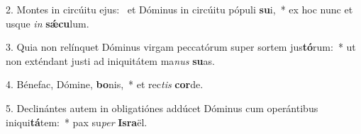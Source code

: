 2. Montes in circúitu ejus: \dag\  et Dóminus in circúitu pópuli \textbf{su}i,~*  ex hoc nunc et usque \textit{in} \textbf{sǽ}\textbf{cu}lum.\

3. Quia non relínquet Dóminus virgam peccatórum super sortem jus\textbf{tó}rum:~*  ut non exténdant justi ad iniquitátem ma\textit{nus} \textbf{su}as.\

4. Bénefac, Dómine, \textbf{bo}nis,~*  et rec\textit{tis} \textbf{cor}de.\

5. Declinántes autem in obligatiónes addúcet Dóminus cum operántibus iniqui\textbf{tá}tem:~*  pax su\textit{per} \textbf{Is}\textbf{ra}ël.\

